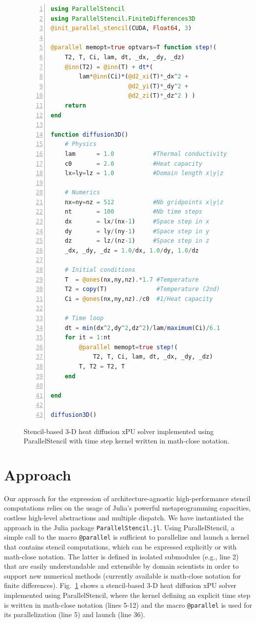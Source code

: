 \documentclass{juliacon}
\begin{document}
\begin{figure}[t]
\begin{lstlisting}[language = Julia, numbers=left, numberstyle=\tiny\color{gray}]
using ParallelStencil
using ParallelStencil.FiniteDifferences3D
@init_parallel_stencil(CUDA, Float64, 3)

@parallel memopt=true optvars=T function step!(
    T2, T, Ci, lam, dt, _dx, _dy, _dz)
    @inn(T2) = @inn(T) + dt*(
        lam*@inn(Ci)*(@d2_xi(T)*_dx^2 + 
                      @d2_yi(T)*_dy^2 + 
                      @d2_zi(T)*_dz^2 ) )
    return
end

function diffusion3D()
    # Physics
    lam      = 1.0           #Thermal conductivity
    c0       = 2.0           #Heat capacity
    lx=ly=lz = 1.0           #Domain length x|y|z

    # Numerics
    nx=ny=nz = 512           #Nb gridpoints x|y|z
    nt       = 100           #Nb time steps
    dx       = lx/(nx-1)     #Space step in x
    dy       = ly/(ny-1)     #Space step in y
    dz       = lz/(nz-1)     #Space step in z
    _dx, _dy, _dz = 1.0/dx, 1.0/dy, 1.0/dz

    # Initial conditions
    T  = @ones(nx,ny,nz).*1.7 #Temperature
    T2 = copy(T)              #Temperature (2nd)
    Ci = @ones(nx,ny,nz)./c0  #1/Heat capacity

    # Time loop
    dt = min(dx^2,dy^2,dz^2)/lam/maximum(Ci)/6.1
    for it = 1:nt
        @parallel memopt=true step!(
            T2, T, Ci, lam, dt, _dx, _dy, _dz)
        T, T2 = T2, T
    end

end

diffusion3D()

\end{lstlisting}

\caption{Stencil-based 3-D heat diffusion xPU solver implemented using ParallelStencil with time step kernel written in math-close notation.}
	\label{fig:code}
\end{figure}

\section{Approach}
Our approach for the expression of architecture-agnostic high-performance stencil computations relies on the usage of Julia's powerful metaprogramming capacities, costless high-level abstractions and multiple dispatch. We have instantiated the approach in the Julia package \texttt{ParallelStencil.jl}. Using ParallelStencil, a simple call to the macro \texttt{@parallel} is sufficient to parallelize and launch a kernel that contains stencil computations, which can be expressed explicitly or with math-close notation. The latter is defined in isolated submodules (e.g., line 2) that are easily understandable and extensible by domain scientists in order to support new numerical methods (currently available is math-close notation for finite differences). Fig.~\ref{fig:code} shows a stencil-based 3-D heat diffusion xPU solver implemented using ParallelStencil, where the kernel defining an explicit time step is written in math-close notation (lines 5-12) and the macro \texttt{@parallel} is used for its parallelization (line 5) and launch (line 36). 
\end{document}
